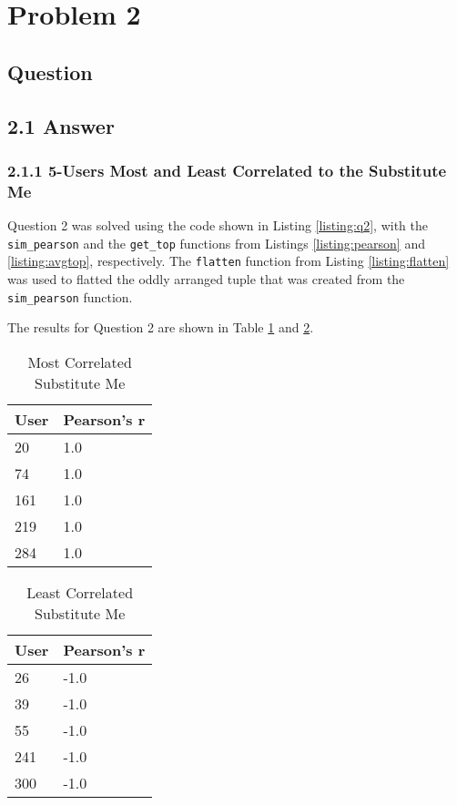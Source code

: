 \section{Problem 2}

\subsection{Question}
\vspace*{10pt}


\subsection{2.1 Answer}
\subsubsection{2.1.1 5-Users Most and Least Correlated to the Substitute Me}
\vspace{3mm}
Question 2 was solved using the code shown in Listing \ref{listing:q2}, with the {\tt sim\_pearson} and the {\tt get\_top} functions from Listings \ref{listing:pearson} and \ref{listing:avgtop}, respectively. The {\tt flatten} function from Listing \ref{listing:flatten} was used to flatted the oddly arranged tuple that was created from the {\tt sim\_pearson} function.





The results for Question 2 are shown in Table \ref{tab:most} and \ref{tab:least}. 

\begin{table}[h!]
\centering
\begin{tabular}{| l | l |}
\hline
User & Pearson's r \\
\hline
20 & 1.0 \\
74 & 1.0 \\
161 & 1.0 \\
219 & 1.0 \\
284 & 1.0 \\
\hline
\end{tabular}
\caption{Most Correlated Substitute Me}
\label{tab:most}
\end{table}

\begin{table}[h!]
\centering
\begin{tabular}{| l | l |}
\hline
User & Pearson's r \\
\hline
26 & -1.0 \\
39 & -1.0 \\
55 & -1.0 \\
241 & -1.0 \\
300 & -1.0 \\
\hline
\end{tabular}
\caption{Least Correlated Substitute Me}
\label{tab:least}
\end{table}

